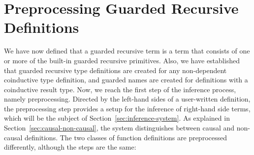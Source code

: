 




\section{Preprocessing Guarded Recursive Definitions}
\label{sec:impl-guard-recurs}
We have now defined that a guarded recursive term is a term that consists of one or
more of the built-in guarded recursive primitives. Also, we have established
that guarded recursive type definitions are created for any non-dependent
coinductive type definition, and guarded names are created for definitions with
a coinductive result type. Now, we reach the first step of the inference
process, namely preprocessing. Directed by the left-hand sides of a user-written
definition, the preprocessing step provides a setup for the inference of
right-hand side terms, which will be the subject of
Section~\ref{sec:inference-system}. As explained in Section~\ref{sec:causal-non-causal},
the system distinguishes between causal and non-causal definitions. The two classes
of function definitions are preprocessed differently, although the steps are
the same:

